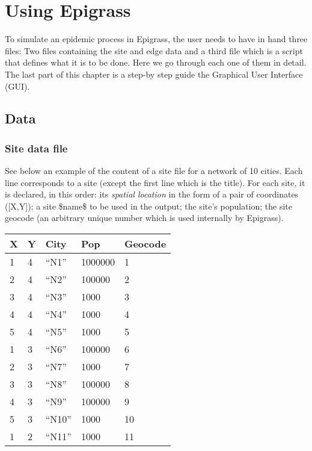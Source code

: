 \documentclass[a4paper,10pt]{manual}
\begin{document}
\hypertarget{using}{}\chapter{Using Epigrass}

To simulate an epidemic process in Epigrass, the user needs to have in hand three files: Two files containing the site and edge data and a third file which is a script that defines what it is to be done. Here we go through each one of them in detail. The last part of this chapter is a step-by step guide the Graphical User Interface (GUI).


\section{Data}


\subsection{Site data file}

See below an example of the content of a site file for a network of 10 cities. Each line corresponds to a site (except the first line which is the title). For each site, it is declared, in this order: its \emph{spatial location} in the form of a pair of coordinates ({[}X,Y{]}); a site \$name\$ to be used in the output; the site's population; the site geocode (an arbitrary unique number which is used internally by Epigrass).

\begin{tabulary}{\textwidth}{|l|l|l|l|l|}
\hline
\textbf{
X
} & \textbf{
Y
} & \textbf{
City
} & \textbf{
Pop
} & \textbf{
Geocode
}\\
\hline

1
 & 
4
 & 
``N1''
 & 
1000000
 & 
1
\\

2
 & 
4
 & 
``N2''
 & 
100000
 & 
2
\\

3
 & 
4
 & 
``N3''
 & 
1000
 & 
3
\\

4
 & 
4
 & 
``N4''
 & 
1000
 & 
4
\\

5
 & 
4
 & 
``N5''
 & 
1000
 & 
5
\\

1
 & 
3
 & 
``N6''
 & 
100000
 & 
6
\\

2
 & 
3
 & 
``N7''
 & 
1000
 & 
7
\\

3
 & 
3
 & 
``N8''
 & 
100000
 & 
8
\\

4
 & 
3
 & 
``N9''
 & 
100000
 & 
9
\\

5
 & 
3
 & 
``N10''
 & 
1000
 & 
10
\\

1
 & 
2
 & 
``N11''
 & 
1000
 & 
11
\\
\hline
\end{tabulary}
\end{document}
